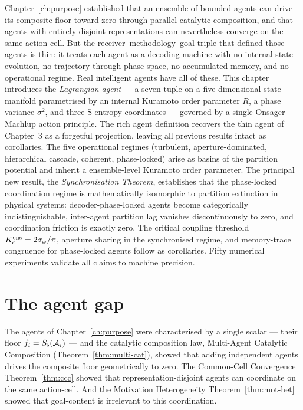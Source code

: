 \begin{chapterabstract}
Chapter~\ref{ch:purpose} established that an ensemble of bounded agents can
drive its composite floor toward zero through parallel catalytic composition,
and that agents with entirely disjoint representations can nevertheless
converge on the same action-cell. But the receiver--methodology--goal triple
that defined those agents is thin: it treats each agent as a decoding machine
with no internal state evolution, no trajectory through phase space, no
accumulated memory, and no operational regime. Real intelligent agents have
all of these. This chapter introduces the \emph{Lagrangian agent} --- a
seven-tuple on a five-dimensional state manifold parametrised by an internal
Kuramoto order parameter $R$, a phase variance $\sigma^2$, and three
S-entropy coordinates --- governed by a single Onsager--Machlup action
principle. The rich agent definition recovers the thin agent of Chapter~3 as
a forgetful projection, leaving all previous results intact as corollaries.
The five operational regimes (turbulent, aperture-dominated, hierarchical
cascade, coherent, phase-locked) arise as basins of the partition potential
and inherit a ensemble-level Kuramoto order parameter. The principal new
result, the \emph{Synchronisation Theorem}, establishes that the phase-locked
coordination regime is mathematically isomorphic to partition extinction in
physical systems: decoder-phase-locked agents become categorically
indistinguishable, inter-agent partition lag vanishes discontinuously to
zero, and coordination friction is exactly zero. The critical coupling
threshold $K_c^{\mathrm{ens}}=2\sigma_\omega/\pi$, aperture sharing in the
synchronised regime, and memory-trace congruence for phase-locked agents
follow as corollaries. Fifty numerical experiments validate all claims to
machine precision.
\end{chapterabstract}

\section{The agent gap}
\label{sec:ch04-intro}

The agents of Chapter~\ref{ch:purpose} were characterised by a single scalar
--- their floor $f_i=S_{\flat}(\mathcal{A}_i)$ --- and the catalytic composition
law, Multi-Agent Catalytic Composition (Theorem~\ref{thm:multi-cat}), showed
that adding independent agents drives the composite floor geometrically to
zero. The Common-Cell Convergence Theorem~\ref{thm:ccc} showed that
representation-disjoint agents can coordinate on the same action-cell. And
the Motivation Heterogeneity Theorem~\ref{thm:mot-het} showed that
goal-content is irrelevant to this coordination.

